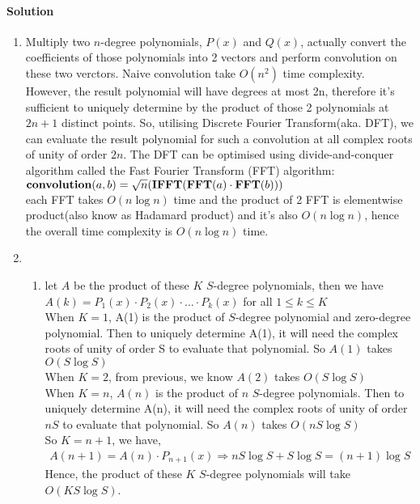 \documentclass[a4paper]{scrartcl}
\newcommand{\CON}{\pPkey{convolution}}
\newcommand{\FFT}{\pPkey{FFT}}
\newcommand{\IFFT}{\pPkey{IFFT}}
\begin{document}
\paragraph{Solution}
\begin{enumerate}[label=(\alph*)]
\item Multiply two $n$-degree polynomials, $P(x)$ and $Q(x)$, actually convert the coefficients of those polynomials into 2 vectors and perform convolution on these two verctors. Naive convolution take $O(n^2)$ time complexity.\\
However, the result polynomial will have degrees at most 2n, therefore it's sufficient to uniquely determine by the product of those 2 polynomials at $2n+1$ distinct points. So, utilising Discrete Fourier Transform(aka. DFT), we can evaluate the result polynomial for such a convolution at all complex roots of unity of order $2n$. The DFT can be optimised using divide-and-conquer algorithm called the Fast Fourier Transform (FFT) algorithm:\\
$ \CON(a,b) = \sqrt{n}(\IFFT(\FFT(a) \cdot \FFT(b)))$\\
each FFT takes $O(n\log{n})$ time and the product of 2 FFT is elementwise product(also know as Hadamard product) and it's also $O(n\log{n})$, hence the overall time complexity is $O(n\log{n})$ time.
\pagebreak
\item\begin{enumerate}[label=(\roman*)]
  \item let $A$ be the product of these $K$ $S$-degree polynomials, then we have $A(k)=P_1(x) \cdot P_2(x) \cdot ... \cdot P_k(x)$ for all $1 \leq k \leq K$\\
  When $K=1$, A(1) is the product of $S$-degree polynomial and zero-degree polynomial. Then to uniquely determine A(1), it will need the complex roots of unity of order S to evaluate that polynomial. So $A(1)$ takes $O(S\log{S})$\\
  When $K=2$, from previous, we know $A(2)$ takes $O(S\log{S})$\\
  When $K=n$, $A(n)$ is the product of $n$ $S$-degree polynomials. Then to uniquely determine A(n), it will need the complex roots of unity of order $nS$ to evaluate that polynomial. So $A(n)$ takes $O(nS\log{S})$\\
  So $K=n+1$, we have,
  \begin{align*}
    A(n+1) = A(n) \cdot P_{n+1}(x) \Rightarrow nS\log{S} + S\log{S} = (n+1)\log{S}
  \end{align*}
  Hence, the product of these $K$ $S$-degree polynomials will take $O(KS\log{S})$.\\

\end{enumerate}
\end{enumerate}
\end{document}

